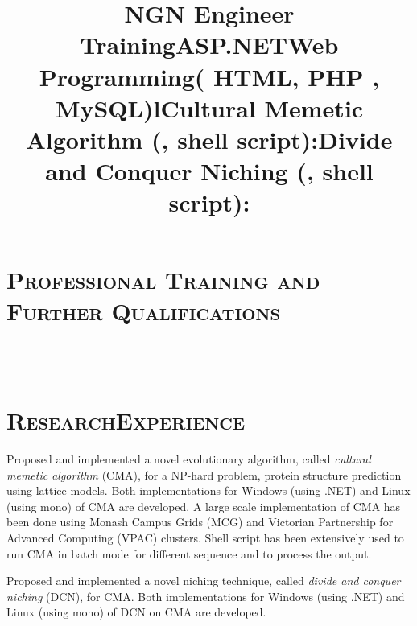 \begin{resume}
\section{\textsc{Professional Training and Further Qualifications}}
\title{\textbf{NGN Engineer Training}}
 
\begin{position}
\end{position}
\vspace*{-.5cm}
\title{\textbf{ASP.NET}}
 
\begin{position}
\end{position}
\vspace*{-.5cm}
\title{\textbf{Web Programming( HTML, PHP , MySQL)}}
 
\begin{position}
\end{position}
\vspace*{-.5cm}

\begin{formatb}
  \title{l} \\
  \body\\
\end{formatb}

\section{\textsc{Research\quad Experience}}
\title{\textbf{Cultural Memetic Algorithm (\CSharp, shell script):}}
\begin{position}
Proposed and implemented a novel evolutionary algorithm, called \textit{cultural memetic algorithm} (CMA), for a NP-hard problem, protein structure prediction using lattice models. Both implementations for Windows (using {\CSharp}.NET) and Linux (using mono) of CMA are developed. A large scale implementation of CMA has been done using Monash Campus Grids (MCG) and Victorian Partnership for Advanced Computing (VPAC) clusters. Shell script has been extensively used to run CMA in batch mode for different sequence and to process the output. 
\end{position}

\title{\textbf{Divide and Conquer Niching (\CSharp, shell script):}}
\begin{position}
Proposed and implemented a novel niching technique, called \textit{divide and conquer niching} (DCN), for CMA. Both implementations for Windows (using {\CSharp}.NET) and Linux (using mono) of DCN on CMA are developed.  
\end{position}


\end{resume}
